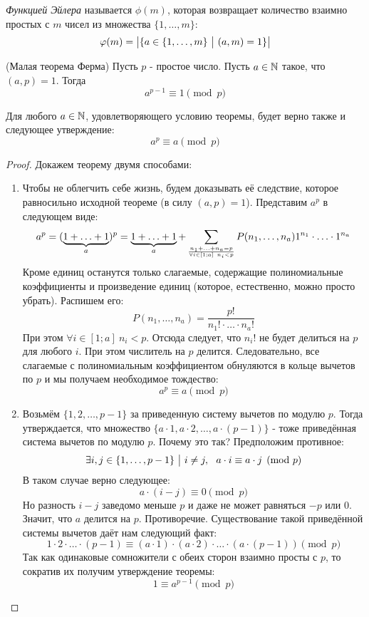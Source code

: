 \begin{definition}
	\textit{Функцией Эйлера} называется $\phi(m)$, которая возвращает количество взаимно простых с $m$ чисел из множества $\{1, \ldots, m\}$:
	\[
		\varphi(m) = \left|\{a \in \{1, \ldots, m\} \ \big|\  (a, m) = 1\}\right|
	\]
\end{definition}

\begin{theorem} (Малая теорема Ферма)
	Пусть $p$ - простое число. Пусть $a \in \mathbb{N}$ такое, что $(a, p) = 1$. Тогда
	\[
		a^{p - 1} \equiv 1 \pmod p
	\]
\end{theorem}

\begin{corollary}
	Для любого $a \in \mathbb{N}$, удовлетворяющего условию теоремы, будет верно также и следующее утверждение:
	\[
		a^p \equiv a \pmod p
	\]
\end{corollary}

\begin{proof} Докажем теорему двумя способами:
\begin{enumerate}
	\item Чтобы не облегчить себе жизнь, будем доказывать её следствие, которое равносильно исходной теореме (в силу $(a, p) = 1$). Представим $a^p$ в следующем виде:
	\[
		a^p = (\underbrace{1 + \ldots + 1}_{a})^p = \underbrace{1 + \ldots + 1}_{a} + \sum\limits_{n_1 + \ldots + n_a = p \over \forall i \in [1; a]\ n_i < p} P(n_1, \ldots, n_a) 1^{n_1} \cdot \ldots \cdot 1^{n_a}
	\]
	Кроме единиц останутся только слагаемые, содержащие полиномиальные коэффициенты и произведение единиц (которое, естественно, можно просто убрать). Распишем его:
	\[
		P(n_1, \ldots, n_a) = \frac{p!}{n_1! \cdot \ldots \cdot n_a!}
	\]
	При этом $\forall i \in [1; a]\ n_i < p$. Отсюда следует, что $n_i!$ не будет делиться на $p$ для любого $i$. При этом числитель на $p$ делится. Следовательно, все слагаемые с полиномиальным коэффициентом обнуляются в кольце вычетов по $p$ и мы получаем необходимое тождество:
	\[
		a^p \equiv a \pmod p
	\]
	
	\item Возьмём $\{1, 2, \ldots, p - 1\}$ за приведенную систему вычетов по модулю $p$. Тогда утверждается, что множество $\{a \cdot 1, a \cdot 2, \ldots, a \cdot (p - 1)\}$ - тоже приведённая система вычетов по модулю $p$. Почему это так? Предположим противное:
	\[
		\exists i, j \in \{1, \ldots, p - 1\} \ \big|\  i \neq j,\ \ a \cdot i \equiv a \cdot j \pmod p
	\]
	В таком случае верно следующее:
	\[
		a \cdot (i - j) \equiv 0 \pmod p
	\]
	Но разность $i - j$ заведомо меньше $p$ и даже не может равняться $-p$ или $0$. Значит, что $a$ делится на $p$. Противоречие. Существование такой приведённой системы вычетов даёт нам следующий факт:
	\[
		1 \cdot 2 \cdot \ldots \cdot (p - 1) \equiv (a \cdot 1) \cdot (a \cdot 2) \cdot \ldots \cdot (a \cdot (p - 1)) \pmod p
	\]
	Так как одинаковые сомножители с обеих сторон взаимно просты с $p$, то сократив их получим утверждение теоремы:
	\[
		1 \equiv a^{p - 1} \pmod p
	\]
\end{enumerate}
\end{proof}

